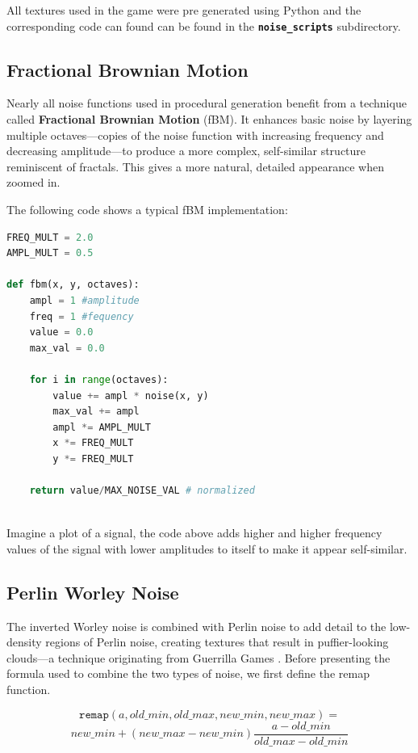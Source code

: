 All textures used in the game were pre generated using Python and the corresponding code can found can be found in the \textbf{\texttt{noise\_scripts}} subdirectory.
\subsection{Fractional Brownian Motion}
\label{sec:fbm}
Nearly all noise functions used in procedural generation benefit from a technique called \textbf{Fractional Brownian Motion} (fBM). It enhances basic noise by layering multiple octaves—copies of the noise function with increasing frequency and decreasing amplitude—to produce a more complex, self-similar structure reminiscent of fractals. This gives a more natural, detailed appearance when zoomed in.

The following code shows a typical fBM implementation:

\begin{lstlisting}[language=Python]
FREQ_MULT = 2.0
AMPL_MULT = 0.5

def fbm(x, y, octaves):
	ampl = 1 #amplitude
    freq = 1 #fequency
    value = 0.0
    max_val = 0.0
    
    for i in range(octaves):
        value += ampl * noise(x, y)
        max_val += ampl 
        ampl *= AMPL_MULT
        x *= FREQ_MULT
        y *= FREQ_MULT
    
    return value/MAX_NOISE_VAL # normalized
			
\end{lstlisting}

Imagine a plot of a signal, the code above adds higher and higher frequency values of the signal with lower amplitudes to itself to make it appear self-similar.

\subsection{Perlin Worley Noise}
The inverted Worley noise is combined with Perlin noise to add detail to the low-density regions of Perlin noise, creating textures that result in puffier-looking clouds—a technique originating from Guerrilla Games \cite{guerrillagames2025nubis}. Before presenting the formula used to combine the two types of noise, we first define the remap function.
\begin{definition}
    \[\texttt{remap}(a, old\_min, old\_max, new\_min, new\_max) =\]
    \[new\_min + 
    (new\_max - new\_min)\frac{a-old\_min}{old\_max - old\_min}\]
\end{definition}

